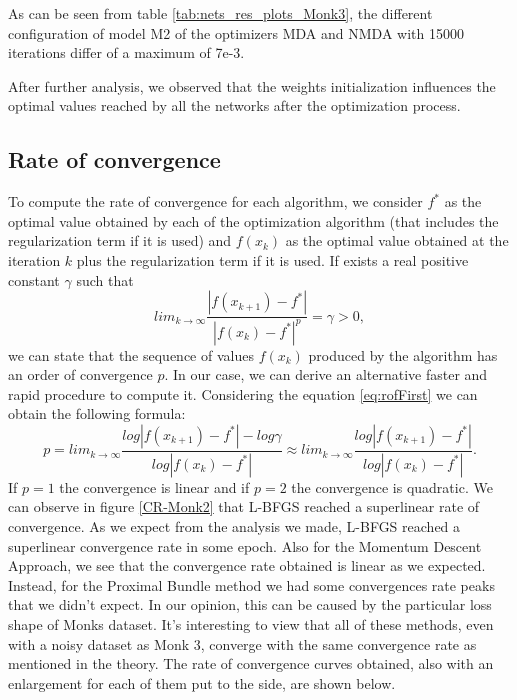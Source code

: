 As can be seen from table \ref{tab:nets_res_plots_Monk3}, the different configuration of model M2 of the optimizers MDA and NMDA with 15000 iterations differ of a maximum of 7e-3. 

After further analysis, we observed that the weights initialization influences the  optimal values reached by all the networks after the optimization process. 

\subsection{Rate of convergence}
\label{sec:rate_of_convergence}
To compute the rate of convergence for each algorithm, we consider $f^*$ as the optimal value obtained by each of the optimization algorithm (that includes the regularization term if it is used) and $f(x_{k})$ as the optimal value obtained at the iteration $k$ plus the regularization term if it is used. If exists a real positive constant $\gamma$ such that
\begin{equation}
\label{eq:rofFirst}
lim_{k\to \infty}\frac{|f(x_{k+1}) - f^* |}{|f(x_{k}) - f^*|^p} = \gamma > 0,
\end{equation}
we can state that the sequence of values $f(x_{k})$ produced by the algorithm has an order of convergence $p$. In our case, we can derive an alternative faster and rapid procedure to compute it. Considering the equation \ref{eq:rofFirst} we can obtain the following formula: 
\begin{equation}
p = lim_{k\to \infty}\frac{log |f(x_{k+1}) - f^* | - log \gamma}{log|f(x_{k}) - f^*|} \approx lim_{k\to \infty}\frac{log |f(x_{k+1}) - f^* |}{log|f(x_{k}) - f^*|}.
\end{equation}
If $p=1$ the convergence is linear and if $p=2$ the convergence is quadratic. We can observe in figure \ref{CR-Monk2} that L-BFGS reached a superlinear rate of convergence. 
As we expect from the analysis we made, L-BFGS reached a superlinear convergence rate in some epoch. Also for the Momentum Descent Approach, we see that the convergence rate obtained is linear as we expected. Instead, for the Proximal Bundle method we had some convergences rate peaks that we didn't expect. In our opinion, this can be caused by the particular loss shape of Monks dataset.
It's interesting to view that all of these methods, even with a noisy dataset as Monk 3, converge with the same convergence rate as mentioned in the theory. The rate of convergence curves obtained, also with an enlargement for each of them put to the side, are shown below.

